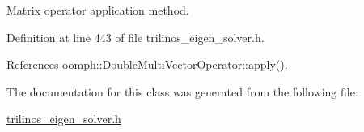 Matrix operator application method. 



Definition at line 443 of file trilinos\+\_\+eigen\+\_\+solver.\+h.



References oomph\+::\+Double\+Multi\+Vector\+Operator\+::apply().



The documentation for this class was generated from the following file\+:\begin{DoxyCompactItemize}
\item 
\hyperlink{trilinos__eigen__solver_8h}{trilinos\+\_\+eigen\+\_\+solver.\+h}\end{DoxyCompactItemize}
